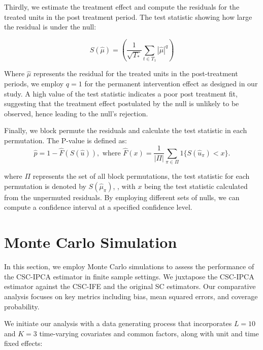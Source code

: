 \documentclass[12pt]{article}
\begin{document}
Thirdly, we estimate the treatment effect and compute the residuals for the treated units in the post treatment period. The test statistic showing how large the residual is under the null:

\begin{equation}
S(\hat{\mu}) = \left(\frac{1}{\sqrt{T_*}}\sum_{t \in T_1} |\hat{\mu}|^q \right)
\end{equation}

Where $\hat{\mu}$ represents the residual for the treated units in the post-treatment periods, we employ $q=1$ for the permanent intervention effect as designed in our study. A high value of the test statistic indicates a poor post treatment fit, suggesting that the treatment effect postulated by the null is unlikely to be observed, hence leading to the null's rejection. 

Finally, we block permute the residuals and calculate the test statistic in each permutation. The P-value is defined as:
\begin{equation}
\hat{p} = 1 - \hat{F}(S(\hat{u})), \text{ where } \hat{F}(x) = \frac{1}{|\Pi|} \sum_{\pi \in \Pi} 1\{S(\hat{u}_\pi) < x\}.
\end{equation}

\noindent where $\Pi$ represents the set of all block permutations, the test statistic for each permutation is denoted by $S(\hat{\mu}_{\pi})$, , with $x$ being the test statistic calculated from the unpermuted residuals. By employing different sets of nulls, we can compute a confidence interval at a specified confidence level.

\section{Monte Carlo Simulation}
\label{sec: simulation}

In this section, we employ Monte Carlo simulations to assess the performance of the CSC-IPCA estimator in finite sample settings. We juxtapose the CSC-IPCA estimator against the CSC-IFE and the original SC estimators. Our comparative analysis focuses on key metrics including bias, mean squared errors, and coverage probability. 

We initiate our analysis with a data generating process that incorporates $L=10$ and $K=3$ time-varying covariates and common factors, along with unit and time fixed effects:
\end{document}
